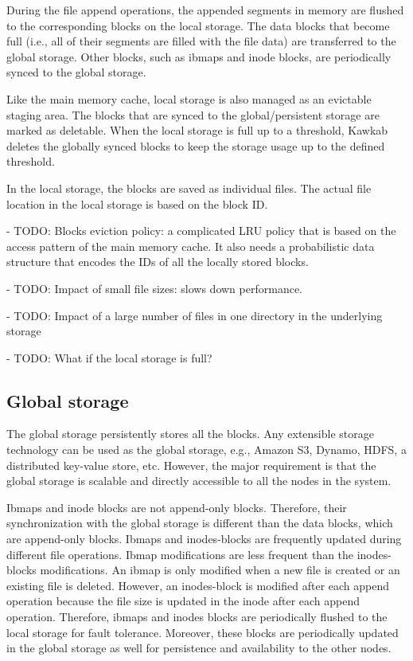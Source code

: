 \documentclass[]{article}
\begin{document}
During the file append operations, the appended segments in memory are flushed
to the corresponding blocks on the local storage.  The data blocks that become
full (i.e., all of their segments are filled with the file data)
are transferred to the global storage.  Other blocks, such as ibmaps and
inode blocks, are periodically synced to the global storage.

Like the main memory cache, local storage is also managed as an evictable
staging area. The blocks that are synced to the global/persistent storage are
marked as deletable. When the local storage is full up to a threshold, Kawkab
deletes the globally synced blocks to keep the storage usage up to
the defined threshold.

In the local storage, the blocks are saved as individual files. The actual
file location in the local storage is based on the block ID.

- TODO: Blocks eviction policy: a complicated LRU policy that is based on the
  access pattern of the main memory cache. It also needs a probabilistic
  data structure that encodes the IDs of all the locally stored blocks.

- TODO: Impact of small file sizes: slows down performance.

- TODO: Impact of a large number of files in one directory in the underlying storage

- TODO: What if the local storage is full?


\subsection{Global storage}

The global storage persistently stores all the blocks. Any extensible storage
technology can be used as the global storage, e.g., Amazon S3, Dynamo, HDFS, a
distributed key-value store, etc. However, the major requirement is that the 
global storage is scalable and directly accessible to all the nodes in the system.

Ibmaps and inode blocks are not append-only blocks. Therefore, their
synchronization with the global storage is different than the data blocks,
which are append-only blocks. Ibmaps and inodes-blocks are frequently updated
during different file operations. Ibmap modifications are less frequent than
the inodes-blocks modifications. An ibmap is only modified when a new file is
created or an existing file is deleted.  However, an inodes-block is modified
after each append operation because the file size is updated in
the inode after each append operation. Therefore, ibmaps and inodes blocks are
periodically flushed to the local storage for fault tolerance.  Moreover, these
blocks are periodically updated in the global storage as well for persistence
and availability to the other nodes.
\end{document}

